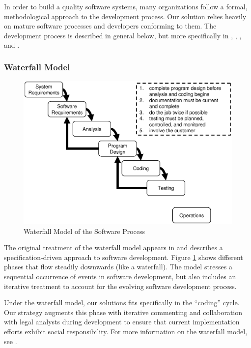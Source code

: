 In order to build a quality software systems, many organizations follow a
formal, methodological approach to the development process. Our solution relies
heavily on mature software processes and developers conforming to them. The
development process is described in general below, but more specifically in 
\cite{Royce1970}, \cite{Boehm1986}, \cite{CMM11}, and \cite{Kehoe1996}.

\subsubsection{Waterfall Model}\label{waterfall}
\begin{figure}[t]
\begin{center}
\includegraphics[scale=0.7]{images/waterfall.eps}
\end{center}
\caption{Waterfall Model of the Software Process}
\label{fig:waterfall}
\end{figure}
The original treatment of the waterfall model appears in \cite{Royce1970} and
describes a specification-driven approach to software development. Figure
\ref{fig:waterfall} shows different phases that flow steadily downwards (like a
waterfall). The model stresses a sequential occurrence of events in software
development, but also includes an iterative treatment to account for the 
evolving software development process.

Under the waterfall model, our solutions fits specifically in the ``coding''
cycle. Our strategy augments this phase with iterative commenting and
collaboration with legal analysts during development to ensure that current
implementation efforts exhibit social responsibility. For more information on
the waterfall model, see \cite{Royce1970}.

